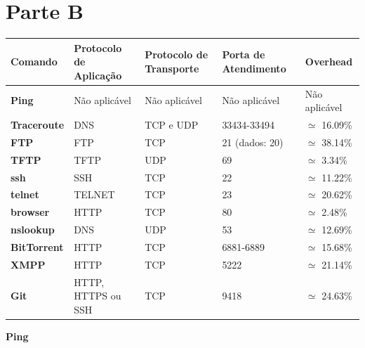 \section{Parte B}

    \begin{tabular} { |p{2.2cm}|p{3.6cm}|p{3.6cm}|p{3.4cm}|p{2.25cm}|  }
        \hline
       
        \textbf{Comando} & \textbf{Protocolo de Aplicação} & \textbf{Protocolo de Transporte} & \textbf{Porta de Atendimento} & \textbf{Overhead} \\
        
        \hline
        \textbf{Ping} & Não aplicável & Não aplicável & Não aplicável & Não aplicável \\
        
        \hline
        \textbf{Traceroute} & DNS & TCP e UDP & 33434-33494  & $\simeq$ 16.09\% \\

        \hline
        \textbf{FTP} & FTP & TCP & 21 (dados: 20) & $\simeq $ 38.14\% \\

        \hline
        \textbf{TFTP} & TFTP & UDP & 69 & $\simeq$ 3.34\% \\

        \hline
        \textbf{ssh} & SSH & TCP & 22 & $\simeq$ 11.22\% \\

        \hline
        \textbf{telnet} & TELNET & TCP & 23 & $\simeq$ 20.62\% \\

        \hline
        \textbf{browser} & HTTP & TCP & 80 & $\simeq$ 2.48\% \\

        \hline
        \textbf{nslookup} & DNS & UDP & 53 & $\simeq$ 12.69\%  \\

        \hline
        \textbf{BitTorrent} & HTTP & TCP & 6881-6889 & $\simeq$ 15.68\% \\

        \hline
        \textbf{XMPP} & HTTP & TCP & 5222 & $\simeq$ 21.14\% \\

        \hline
        \textbf{Git} & HTTP, HTTPS ou SSH & TCP & 9418 & $\simeq$ 24.63\% \\
        
        \hline
    \end{tabular}

    \vspace{15pt}
    \textbf{\large Ping}

